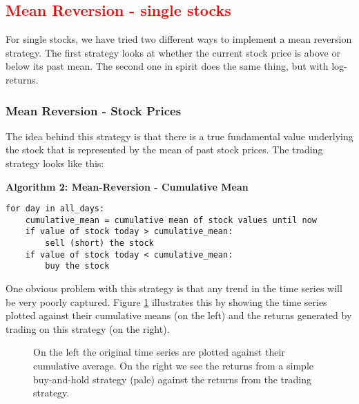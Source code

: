 \subsection{\textcolor{red}{Mean Reversion - single stocks}}
For single stocks, we have tried two different ways to implement a mean reversion strategy. The first strategy looks at whether the current stock price is above or below its past mean. The second one in spirit does the same thing, but with log-returns. 

\subsubsection{Mean Reversion - Stock Prices}
The idea behind this strategy is that there is a true fundamental value underlying the stock that is represented by the mean of past stock prices. The trading strategy looks like this: 

\vspace{2ex}
\textbf{\small{Algorithm 2: Mean-Reversion - Cumulative Mean}}
\vspace{-1ex}
\begin{verbatim}
for day in all_days: 
    cumulative_mean = cumulative mean of stock values until now
    if value of stock today > cumulative_mean:
        sell (short) the stock
    if value of stock today < cumulative_mean:
        buy the stock
\end{verbatim}

One obvious problem with this strategy is that any trend in the time series will be very poorly captured. Figure \ref{fig:mean_reversion_cum_mean} illustrates this by showing the time series plotted against their cumulative means (on the left) and the returns generated by trading on this strategy (on the right). 
\begin{figure}[h!]
    \centering
    \begin{minipage}[b]{0.49\textwidth}
        \centering
            \begin{adjustbox}{width=\textwidth,center}
                
            \end{adjustbox}
    \end{minipage}
    \hfill
    \begin{minipage}[b]{0.49\textwidth}
        \centering
        \begin{adjustbox}{width=\textwidth,center, scale={1}{1.2}}
            
        \end{adjustbox}
    \end{minipage}
    \caption{On the left the original time series are plotted against their cumulative average. On the right we see the returns from a simple buy-and-hold strategy (pale) against the returns from the trading strategy.}
    \label{fig:mean_reversion_cum_mean}
\end{figure}{}

